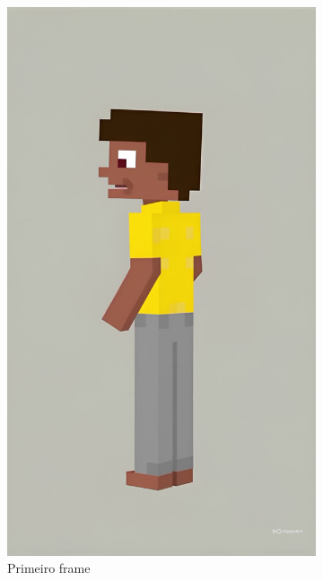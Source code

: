 \begin{figure}[htbp]
    \centering
    \caption{\small Frames do vídeo gerado no OpenArt.AI}
    \label{fig:openArtVideoFrames}
    \begin{subfigure}{0.45\linewidth}
    \centering
        \includegraphics[width=0.65\linewidth]{figs/OpenArtAI/frame1.jpg}
        \caption{\small Primeiro frame}
        \label{fig:openArtVideoFrames1}
    \end{subfigure}
    \begin{subfigure}{0.45\linewidth}
    \centering

\end{subfigure}
\end{figure}
